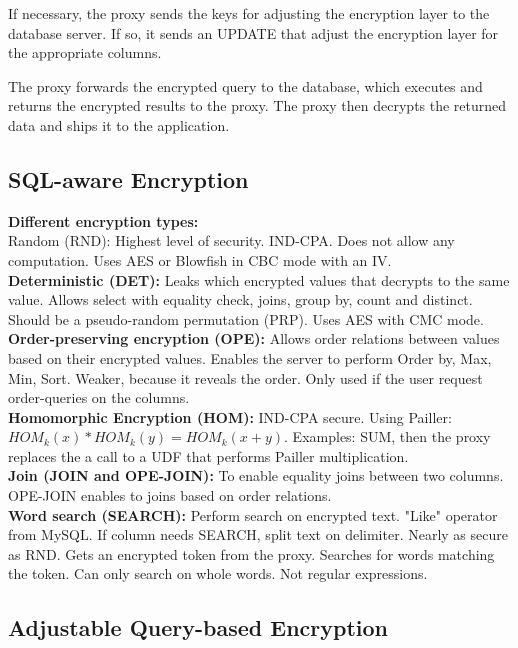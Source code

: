 \documentclass[10pt]{article}
\begin{document}
If necessary, the proxy sends the keys for adjusting the encryption layer to the database server. If so, it sends an UPDATE that adjust the encryption layer for the appropriate columns.

The proxy forwards the encrypted query to the database, which executes and returns the encrypted results to the proxy. The proxy then decrypts the returned data and ships it to the application.

\subsection{SQL-aware Encryption}
\textbf{Different encryption types:}\\
Random (RND): Highest level of security. IND-CPA. Does not allow any computation. Uses AES or Blowfish in CBC mode with an IV.\\

\textbf{Deterministic (DET):} Leaks which encrypted values that decrypts to the same value. Allows select with equality check, joins, group by, count and distinct. Should be a pseudo-random permutation (PRP). Uses AES with CMC mode.\\

\textbf{Order-preserving encryption (OPE):} Allows order relations between values based on their encrypted values. Enables the server to perform Order by, Max, Min, Sort. Weaker, because it reveals the order. Only used if the user request order-queries on the columns.\\

\textbf{Homomorphic Encryption (HOM):} IND-CPA secure. Using Pailler: $HOM_k(x) * HOM_k(y) = HOM_k(x + y)$. Examples: SUM, then the proxy replaces the a call to a UDF that performs Pailler multiplication.\\ 

\textbf{Join (JOIN and OPE-JOIN):} To enable equality joins between two columns. OPE-JOIN enables to joins based on order relations.\\

\textbf{Word search (SEARCH):} Perform search on encrypted text. "Like" operator from MySQL.
If column needs SEARCH, split text on delimiter. Nearly as secure as RND. Gets an encrypted token from the proxy. Searches for words matching the token. Can only search on whole words. Not regular expressions.

\subsection{Adjustable Query-based Encryption}
\end{document}
